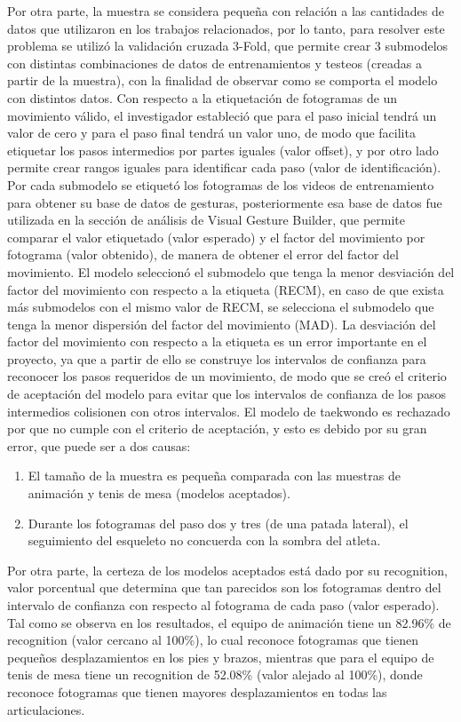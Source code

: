 \medbreak
Por otra parte, la muestra se considera peque\~na con relaci\'on a las cantidades de datos que utilizaron en los trabajos relacionados, por lo tanto, para resolver este problema se utiliz\'o la validaci\'on cruzada 3-Fold, que permite crear 3 submodelos con distintas combinaciones de datos de entrenamientos y testeos (creadas a partir de la muestra), con la finalidad de observar como se comporta el modelo con distintos datos.
\medbreak
Con respecto a la etiquetaci\'on de fotogramas de un movimiento v\'alido, el investigador estableci\'o que para el paso inicial tendr\'a un valor de cero y para el paso final tendr\'a un valor uno, de modo que facilita etiquetar los pasos intermedios por partes iguales (valor offset), y por otro lado permite crear rangos iguales para identificar cada paso (valor de identificaci\'on).
\medbreak
Por cada submodelo se etiquet\'o los fotogramas de los videos de entrenamiento para obtener su base de datos de gesturas, posteriormente esa base de datos fue utilizada en la secci\'on de an\'alisis de Visual Gesture Builder, que permite comparar el valor etiquetado (valor esperado) y el factor del movimiento por fotograma (valor obtenido), de manera de obtener el error del factor del movimiento.
\medbreak
El modelo seleccion\'o el submodelo que tenga la menor desviaci\'on del factor del movimiento con respecto a la etiqueta (RECM), en caso de que exista m\'as submodelos con el mismo valor de RECM, se selecciona el submodelo que tenga la menor dispersi\'on del factor del movimiento (MAD).
\medbreak
La desviaci\'on del factor del movimiento con respecto a la etiqueta es un error importante en el proyecto, ya que a partir de ello se construye los intervalos de confianza para reconocer los pasos requeridos de un movimiento, de modo que se cre\'o el criterio de aceptaci\'on del modelo para evitar que los intervalos de confianza de los pasos intermedios colisionen con otros intervalos.
\medbreak
El modelo de taekwondo es rechazado por que no cumple con el criterio de aceptaci\'on, y esto es debido por su gran error, que puede ser a dos causas:
\begin{enumerate}[1.]
\item El tama\~no de la muestra es peque\~na comparada con las muestras de animaci\'on y tenis de mesa (modelos aceptados).
\item Durante los fotogramas del paso dos y tres (de una patada lateral), el seguimiento del esqueleto no concuerda con la sombra del atleta.
\end{enumerate}
Por otra parte, la certeza de los modelos aceptados est\'a dado por su recognition, valor porcentual que determina que tan parecidos son los fotogramas dentro del intervalo de confianza con respecto al fotograma de cada paso (valor esperado). Tal como se observa en los resultados, el equipo de animaci\'on tiene un 82.96\% de recognition (valor cercano al 100\%), lo cual reconoce fotogramas que tienen peque\~nos desplazamientos en los pies y brazos, mientras que para el equipo de tenis de mesa tiene un recognition de 52.08\%  (valor alejado al 100\%), donde reconoce fotogramas que tienen mayores desplazamientos en todas las articulaciones.
